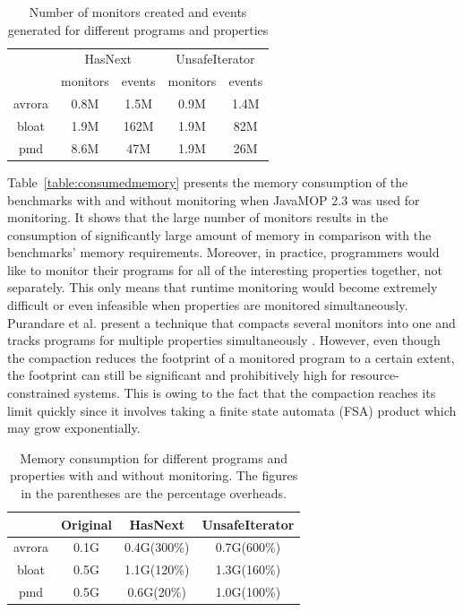 \begin{table}[t]
\centering
\begin{tabular}{|c|c|c|c|c|}
\hline
\multirow{2}{*}{} & \multicolumn{2}{c|}{HasNext} & 
\multicolumn{2}{c|}{UnsafeIterator} \\
\cline{2-5} 
                  & monitors     & events        & monitors         & events     
      \\ \hline
avrora            & 0.8M      & 1.5M       & 0.9M         & 1.4M          \\ 
\hline
bloat             & 1.9M      & 162M    & 1.9M          & 82M         \\ \hline
pmd               & 8.6M      & 47M      & 1.9M          & 26M         \\ \hline
\end{tabular}
\caption{Number of monitors created and events generated for different programs 
and properties}
\end{table}
\label{table:numofmonitors}

Table~\ref{table:consumedmemory} presents the memory consumption of the 
benchmarks with and without monitoring when JavaMOP 2.3 was used for monitoring. 
It shows that the large number of monitors results in the consumption of 
significantly large amount of memory in comparison with the benchmarks' memory 
requirements. Moreover, in practice, programmers would like to monitor their 
programs for all of the interesting properties together, not separately. This 
only means that runtime monitoring would become extremely difficult or even 
infeasible when properties are monitored simultaneously. Purandare et al. 
present a technique that compacts several monitors into one and tracks programs 
for multiple properties simultaneously \cite{}. However, even though the compaction 
reduces the footprint of a monitored program to a certain extent, the footprint 
can still be significant and prohibitively high for 
resource-constrained systems. This is owing to the fact that the compaction 
reaches its limit quickly since 
it involves taking a finite state automata (FSA) product which may grow 
exponentially.

\begin{table}[t]
\centering
\begin{tabular}{|c|c|c|c|}
\hline
 {} & Original & HasNext & UnsafeIterator\\
 \hline
avrora            & 0.1G      & 0.4G(300\%)       & 0.7G(600\%)           \\ 
\hline
bloat             & 0.5G      & 1.1G(120\%)    & 1.3G(160\%)              \\ 
\hline
pmd               & 0.5G      & 0.6G(20\%)     & 1.0G(100\%)             \\ 
\hline
\end{tabular}
\caption{Memory consumption for different programs and properties with and 
without monitoring. The figures in the parentheses are the percentage 
overheads.}
\end{table}
\label{table:consumedmemory}

